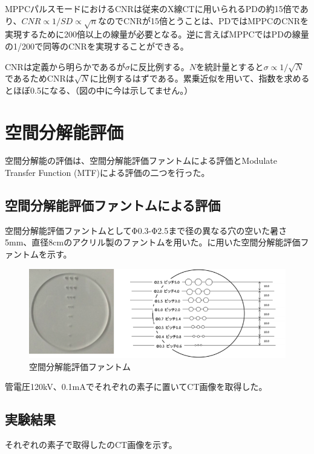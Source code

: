MPPCパルスモードにおけるCNRは従来のX線CTに用いられるPDの約15倍であり、$CNR\propto 1/SD\propto\sqrt{n} $なのでCNRが15倍とうことは、PDではMPPCのCNRを実現するために200倍以上の線量が必要となる。逆に言えばMPPCではPDの線量の1/200で同等のCNRを実現することができる。

CNRは定義から明らかであるが$\sigma$に反比例する。$N$を統計量とすると$\sigma\propto1/\sqrt{N}$であるためCNRは$\sqrt{N}$に比例するはずである。累乗近似を用いて、指数を求めるとほぼ0.5になる、（図の中に今は示してません。）
\fi

\section{空間分解能評価}

空間分解能の評価は、空間分解能評価ファントムによる評価とModulate Transfer Function (MTF)による評価の二つを行った。
\subsection{空間分解能評価ファントムによる評価}
空間分解能評価ファントムとしてΦ0.3-Φ2.5まで径の異なる穴の空いた暑さ5mm、直径8cmのアクリル製のファントムを用いた。に用いた空間分解能評価ファントムを示す。
\begin{figure}[H]
 \begin{center}
 \includegraphics[bb=0.000000 0.000000 350.850996 121.909922,width=1.0\hsize]{image2/chapter5/spatial_phantom.png}
 \end{center}
 \caption{空間分解能評価ファントム}
 \label{fig:spatial_phantom}
\end{figure}
管電圧120kV、0.1mAでそれぞれの素子に置いてCT画像を取得した。

\subsection{実験結果}

それぞれの素子で取得したのCT画像を示す。

